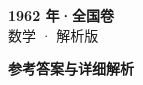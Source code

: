 \documentclass[zihao=-4, a4paper]{ctexart}
\begin{document}
\begin{center}
  {\Large\bfseries 1962 年·全国卷}\\[4pt]
  {\large 数学 · 解析版}
\end{center}
\medskip
{}

\clearpage
{}
\begin{center}{\Large\bfseries 参考答案与详细解析}\end{center}
\medskip

\end{document}
